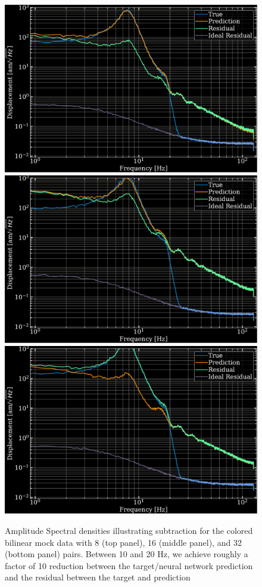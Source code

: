 \begin{refsection}
\begin{figure}[htbp]
   \centering
   \includegraphics[width=.7\columnwidth]{chapter_noise_sub/etc/spectra8C}
    \includegraphics[width=.7\columnwidth]{chapter_noise_sub/etc/spectra16C}
     \includegraphics[width=.7\columnwidth]{chapter_noise_sub/etc/spectra32C}
   \caption{Amplitude Spectral densities illustrating subtraction for the colored bilinear mock data with 8 (top panel), 16 (middle panel), and 32 (bottom panel) pairs. Between 10 and 20 Hz, we achieve roughly a factor of 10 reduction between the target/neural network prediction and the residual between the target and prediction}
   \label{fig:ASD2}
\end{figure}


\end{refsection}
